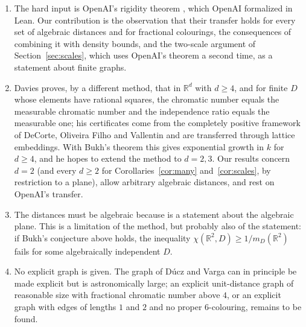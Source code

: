 \documentclass[11pt,a4paper]{amsart}
\theoremstyle{definition}
\theoremstyle{remark}
\newcommand{\R}{\mathbb{R}}
\begin{document}
\begin{enumerate}
\item The hard input is OpenAI's rigidity theorem \cite[Thm.~2.3]{OpenAI}, which OpenAI formalized in Lean. Our
contribution is the observation that their transfer holds for every set of algebraic distances and for fractional
colourings, the consequences of combining it with density bounds, and the two-scale argument of
Section~\ref{sec:scales}, which uses OpenAI's theorem a second time, as a statement about finite graphs.
\item Davies \cite{Davies} proves, by a different method, that in $\R^d$ with $d\ge4$, and for finite $D$ whose
elements have rational squares, the chromatic number equals the measurable chromatic number and the independence
ratio equals the measurable one; his certificates come from the completely positive framework of DeCorte,
Oliveira Filho and Vallentin and are transferred through lattice embeddings. With Bukh's theorem this gives
exponential growth in $k$ for $d\ge4$, and he hopes to extend the method to $d=2,3$. Our results concern $d=2$ (and
every $d\ge2$ for Corollaries~\ref{cor:many} and~\ref{cor:scales}, by restriction to a plane), allow arbitrary algebraic
distances, and rest on OpenAI's transfer.
\item The distances must be algebraic because \cite[Thm.~2.3]{OpenAI} is a statement about the algebraic plane.
This is a limitation of the method, but probably also of the statement: if Bukh's conjecture above holds, the
inequality $\chi(\R^2,D)\ge1/m_D(\R^2)$ fails for some algebraically independent $D$.
\item No explicit graph is given. The graph of Dúcz and Varga can in principle be made explicit but is astronomically
large; an explicit unit-distance graph of reasonable size with fractional chromatic number above $4$, or an explicit
graph with edges of lengths $1$ and $2$ and no proper $6$-colouring, remains to be found.
\end{enumerate}
\end{document}
